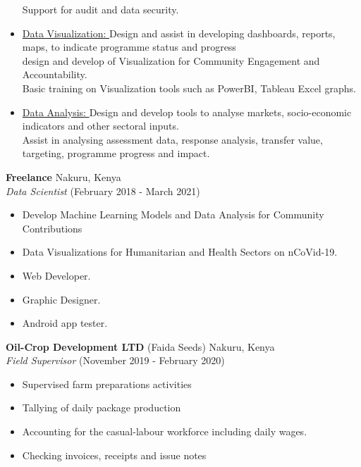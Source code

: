 \documentclass[line,margin,10pt]{res}
\begin{document}
\begin{resume}
\begin{itemize}
    Support for audit and data security.\\
    \item \underline{Data Visualization: }
    Design and assist in developing dashboards, reports, maps, to indicate programme status and progress\\
    design and develop of Visualization for Community Engagement and Accountability.\\
    Basic training on Visualization tools such as PowerBI, Tableau Excel graphs.\\
    \item \underline{Data Analysis: }
    Design and develop tools to analyse markets, socio-economic indicators and other sectoral inputs.\\
    Assist in analysing assessment data, response analysis, transfer value, targeting, programme progress and impact.\\
\end{itemize}

\textbf{Freelance} \hfill Nakuru, Kenya\\
{\sl Data Scientist} \hfill (February 2018 - March 2021)
\begin{itemize} \itemsep -2pt
    \item Develop Machine Learning Models and Data Analysis for Community Contributions
    \item Data Visualizations for Humanitarian and Health Sectors on nCoVid-19.
    \item Web Developer.
    \item Graphic Designer.
    \item Android app tester.
\end{itemize}

\textbf{Oil-Crop Development LTD} (Faida Seeds) \hfill Nakuru, Kenya\\
{\sl Field Supervisor} \hfill (November 2019 - February 2020)
\begin{itemize} \itemsep -2pt
    \item Supervised farm preparations activities
    \item Tallying of daily package production
    \item Accounting for the casual-labour workforce including daily wages.
    \item Checking invoices, receipts and issue notes
\end{itemize}
{\vspace{-0.25cm}}


\end{resume}
\end{document}
